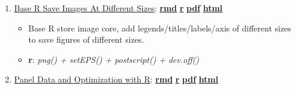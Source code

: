 \documentclass[
]{book}
\providecommand{\tightlist}{%
  \setlength{\itemsep}{0pt}\setlength{\parskip}{0pt}}
\begin{document}
\begin{enumerate}
\def\labelenumi{\arabic{enumi}.}
\tightlist
\item
  \href{https://fanwangecon.github.io/R4Econ/tabgraph/inout/htmlpdfr/fs_img_io.html}{Base R Save Images At Different Sizes}: \href{https://github.com/FanWangEcon/R4Econ/blob/master/tabgraph/inout//fs_img_io.Rmd}{\textbf{rmd}} \textbar{} \href{https://github.com/FanWangEcon/R4Econ/blob/master/tabgraph/inout/htmlpdfr/fs_img_io.R}{\textbf{r}} \textbar{} \href{https://github.com/FanWangEcon/R4Econ/blob/master/tabgraph/inout/htmlpdfr/fs_img_io.pdf}{\textbf{pdf}} \textbar{} \href{https://fanwangecon.github.io/R4Econ/tabgraph/inout/htmlpdfr/fs_img_io.html}{\textbf{html}}

  \begin{itemize}
  \tightlist
  \item
    Base R store image core, add legends/titles/labels/axis of different sizes to save figures of different sizes.
  \item
    \textbf{r}: \emph{png() + setEPS() + postscript() + dev.off()}
  \end{itemize}
\item
  \href{https://fanwangecon.github.io/R4Econ//htmlpdfr/title.html}{Panel Data and Optimization with R}: \href{https://github.com/FanWangEcon/R4Econ/blob/master///title.Rmd}{\textbf{rmd}} \textbar{} \href{https://github.com/FanWangEcon/R4Econ/blob/master//htmlpdfr/title.R}{\textbf{r}} \textbar{} \href{https://github.com/FanWangEcon/R4Econ/blob/master//htmlpdfr/title.pdf}{\textbf{pdf}} \textbar{} \href{https://fanwangecon.github.io/R4Econ//htmlpdfr/title.html}{\textbf{html}}
\end{enumerate}

  
\end{document}
